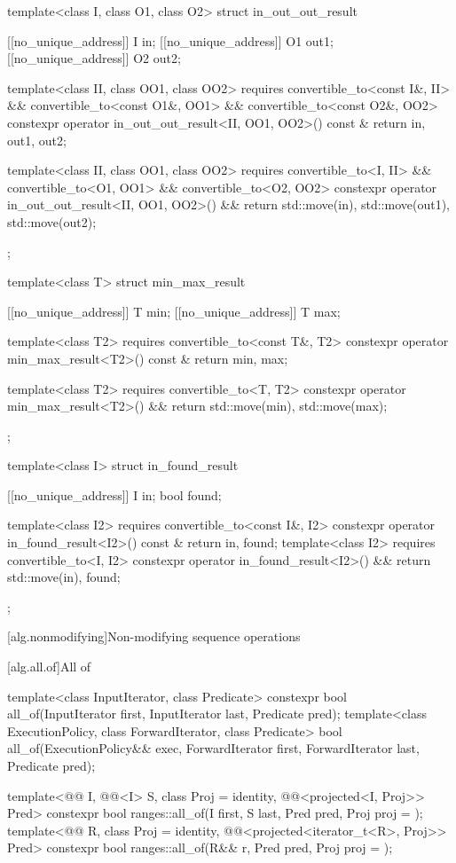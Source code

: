 \begin{codeblock}
{  template<class I, class O1, class O2>
  struct in_out_out_result {
    [[no_unique_address]] I  in;
    [[no_unique_address]] O1 out1;
    [[no_unique_address]] O2 out2;

    template<class II, class OO1, class OO2>
      requires convertible_to<const I&, II> &&
               convertible_to<const O1&, OO1> &&
               convertible_to<const O2&, OO2>
    constexpr operator in_out_out_result<II, OO1, OO2>() const & {
      return {in, out1, out2};
    }

    template<class II, class OO1, class OO2>
      requires convertible_to<I, II> &&
               convertible_to<O1, OO1> &&
               convertible_to<O2, OO2>
    constexpr operator in_out_out_result<II, OO1, OO2>() && {
      return {std::move(in), std::move(out1), std::move(out2)};
    }
  };

  template<class T>
  struct min_max_result {
    [[no_unique_address]] T min;
    [[no_unique_address]] T max;

    template<class T2>
      requires convertible_to<const T&, T2>
    constexpr operator min_max_result<T2>() const & {
      return {min, max};
    }

    template<class T2>
      requires convertible_to<T, T2>
    constexpr operator min_max_result<T2>() && {
      return {std::move(min), std::move(max)};
    }
  };

  template<class I>
  struct in_found_result {
    [[no_unique_address]] I in;
    bool found;

    template<class I2>
      requires convertible_to<const I&, I2>
    constexpr operator in_found_result<I2>() const & {
      return {in, found};
    }
    template<class I2>
      requires convertible_to<I, I2>
    constexpr operator in_found_result<I2>() && {
      return {std::move(in), found};
    }
  };
}
\end{codeblock}

[alg.nonmodifying]{Non-modifying sequence operations}

[alg.all.of]{All of}

%
\begin{itemdecl}
template<class InputIterator, class Predicate>
  constexpr bool all_of(InputIterator first, InputIterator last, Predicate pred);
template<class ExecutionPolicy, class ForwardIterator, class Predicate>
  bool all_of(ExecutionPolicy&& exec, ForwardIterator first, ForwardIterator last,
              Predicate pred);

template<@@ I, @@<I> S, class Proj = identity,
         @@<projected<I, Proj>> Pred>
  constexpr bool ranges::all_of(I first, S last, Pred pred, Proj proj = {});
template<@@ R, class Proj = identity,
         @@<projected<iterator_t<R>, Proj>> Pred>
  constexpr bool ranges::all_of(R&& r, Pred pred, Proj proj = {});
\end{itemdecl}

